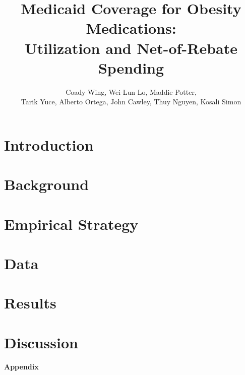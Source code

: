 \documentclass[12pt]{article}
\title{Medicaid Coverage for Obesity Medications: \\ Utilization and Net-of-Rebate Spending}
\author{Coady Wing, Wei-Lun Lo, Maddie Potter, \\
Tarik Yuce, Alberto Ortega, John Cawley, Thuy Nguyen, Kosali Simon}
\begin{document}
\maketitle
\thispagestyle{empty}
\begin{abstract}
    
\end{abstract}

\newpage
{}

\section{Introduction}


\section{Background}


\section{Empirical Strategy}\label{sec:methods}


\section{Data}


\section{Results}


\section{Discussion}


\clearpage


\newpage
\printbibliography

\appendix
\clearpage
{}

\begin{center}
{\LARGE\bfseries Appendix}
\end{center}
\vspace{1em}


\clearpage


\clearpage{}


\clearpage{}
\end{document}

